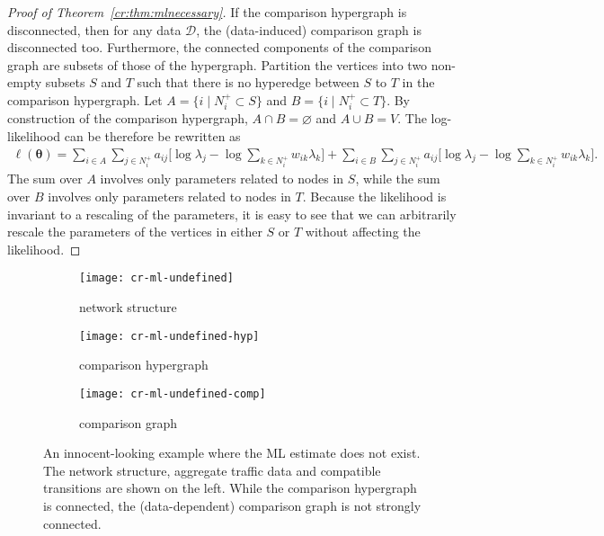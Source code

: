 \begin{proof}[Proof of Theorem~\ref{cr:thm:mlnecessary}]
If the comparison hypergraph is disconnected, then for any data $\mathcal{D}$, the (data-induced) comparison graph is disconnected too.
Furthermore, the connected components of the comparison graph are subsets of those of the hypergraph.
Partition the vertices into two non-empty subsets $S$ and $T$ such that there is no hyperedge between $S$ to $T$ in the comparison hypergraph.
Let $A = \{ i \mid N^+_i \subset S \}$ and $B = \{ i \mid N^+_i \subset T \}$.
By construction of the comparison hypergraph, $A \cap B = \varnothing$ and $A \cup B = V$.
The log-likelihood can be therefore be rewritten as
\begin{align*}
\ell(\bm{\theta}) =
    \sum_{i \in A} \sum_{j \in N^+_i} a_{ij} \bigg[ \log \lambda_j - \log \sum_{k \in N^+_i} w_{ik} \lambda_k \bigg]
    + \sum_{i \in B} \sum_{j \in N^+_i} a_{ij} \bigg[ \log \lambda_j - \log \sum_{k \in N^+_i} w_{ik} \lambda_k \bigg].
\end{align*}
The sum over $A$ involves only parameters related to nodes in $S$, while the sum over $B$ involves only parameters related to nodes in $T$.
Because the likelihood is invariant to a rescaling of the parameters, it is easy to see that we can arbitrarily rescale the parameters of the vertices in either $S$ or $T$ without affecting the likelihood.
\end{proof}

\begin{figure}
  \begin{subfigure}{.33\textwidth}
    \centering
    \texttt{[image: cr-ml-undefined]}
    \caption{network structure}
  \end{subfigure}%
  \begin{subfigure}{.33\textwidth}
    \centering
    \texttt{[image: cr-ml-undefined-hyp]}
    \caption{comparison hypergraph}
  \end{subfigure}
  \begin{subfigure}{.33\textwidth}
    \centering
    \texttt{[image: cr-ml-undefined-comp]}
    \caption{comparison graph}
  \end{subfigure}
  \caption{An innocent-looking example where the ML estimate does not exist.
  The network structure, aggregate traffic data and compatible transitions are shown on the left.
  While the comparison hypergraph is connected, the (data-dependent) comparison graph is not strongly connected.}
  \label{cr:fig:badexample}
\end{figure}


